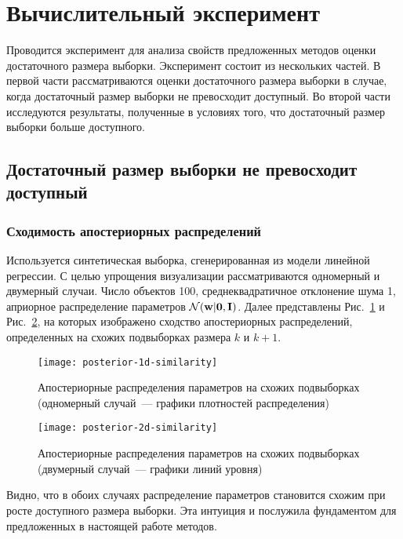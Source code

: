 \section{Вычислительный эксперимент}\label{sec4}

Проводится эксперимент для анализа свойств предложенных методов оценки достаточного размера выборки. Эксперимент состоит из нескольких частей. В первой части рассматриваются оценки достаточного размера выборки в случае, когда достаточный размер выборки не превосходит доступный. Во второй части исследуются результаты, полученные в условиях того, что достаточный размер выборки больше доступного.

\subsection{Достаточный размер выборки не превосходит доступный}

\subsubsection{Сходимость апостериорных распределений}

Используется синтетическая выборка, сгенерированная из модели линейной регрессии. С целью упрощения визуализации рассматриваются одномерный и двумерный случаи. Число объектов 100, среднеквадратичное отклонение шума 1, априорное распределение параметров $\mathcal{N}(\mathbf{w} | \mathbf{0}, \mathbf{I})$. Далее представлены Рис.~\ref{posterior-1d-similarity} и Рис.~\ref{posterior-2d-similarity}, на которых изображено сходство апостериорных распределений, определенных на схожих подвыборках размера $k$ и $k+1$.

\begin{figure}[h!]
    \centering
    \texttt{[image: posterior-1d-similarity]}
    \caption{Апостериорные распределения параметров на схожих подвыборках (одномерный случай~--- графики плотностей распределения)}
    \label{posterior-1d-similarity}
\end{figure}

\begin{figure}[h!]
    \centering
    \texttt{[image: posterior-2d-similarity]}
    \caption{Апостериорные распределения параметров на схожих подвыборках (двумерный случай~--- графики линий уровня)}
    \label{posterior-2d-similarity}
\end{figure}

Видно, что в обоих случаях распределение параметров становится схожим при росте доступного размера выборки. Эта интуиция и послужила фундаментом для предложенных в настоящей работе методов.

